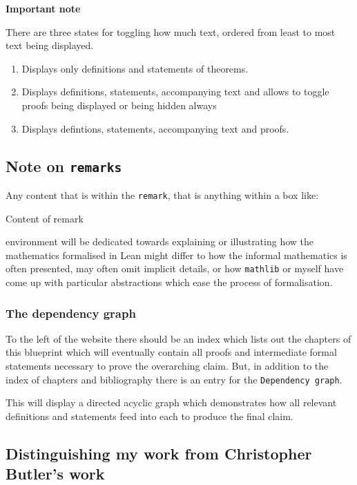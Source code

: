 \textbf{Important note}

There are three states for toggling how much text, ordered from least to most text being displayed.

\begin{enumerate}
    \item Displays only definitions and statements of theorems.
    \item Displays definitions, statements, accompanying text and allows to toggle proofs being displayed or being hidden always
    \item Displays defintions, statements, accompanying text and proofs.
\end{enumerate}

\subsection{Note on \texttt{remarks}}

Any content that is within the \texttt{remark}, that is anything within a box like:

\begin{remark}[A remark]
    Content of remark
\end{remark}

environment will be dedicated towards explaining or illustrating how the mathematics formalised in Lean might differ to 
how the informal mathematics is often presented, may often omit implicit details, or how \texttt{mathlib} or myself have come up with particular
abstractions which ease the process of formalisation.

\subsubsection{The dependency graph}

To the left of the website there should be an index which lists out the chapters of this blueprint which will eventually contain all proofs and intermediate formal statements necessary
to prove the overarching claim. But, in addition to the index of chapters and bibliography there is an entry for the \texttt{Dependency graph}.

This will display a directed acyclic graph which demonstrates how all relevant definitions and statements feed into each to produce the final claim.

\subsection{Distinguishing my work from Christopher Butler's work}


